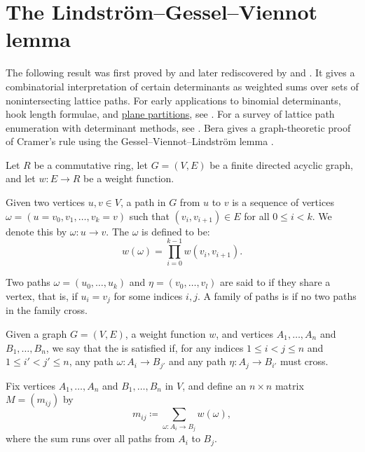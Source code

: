 


\section[lgvLemma]{The Lindström--Gessel--Viennot lemma}

The following result was first proved by  \cite{Lindstrom1973}
and later rediscovered by  and  \cite{GesselViennot1989}.
It gives a combinatorial interpretation of certain determinants as weighted sums over
sets of nonintersecting lattice paths.
For early applications to binomial determinants, hook length formulae, and
\hyperref[planePartitions]{plane partitions}, see
\cite{GesselViennot1985,GesselViennot1989}.  For a
survey of lattice path enumeration with determinant methods, see
\cite{Krattenthaler2015}.
Bera gives a graph-theoretic proof of Cramer's rule using the
Gessel--Viennot--Lindström lemma \cite{Bera2025x}.

Let $R$ be a commutative ring, let $G=(V,E)$ be a finite directed acyclic graph,
and let $w : E \to R$ be a weight function.

Given two vertices $u, v \in V$, a path in $G$ from $u$ to $v$ is a
sequence of vertices $\omega = (u = v_0, v_1, \dotsc, v_k = v)$ such
that $(v_i, v_{i+1}) \in E$ for all $0 \le i < k$.  We denote this by
$\omega : u \to v$.
The  $\omega$ is defined to be:
\[
w(\omega) = \prod_{i=0}^{k-1} w(v_i, v_{i+1}).
\]

\begin{definition}
Two paths $\omega = (u_0, \dotsc, u_k)$ and
$\eta = (v_0, \dotsc, v_l)$ are said to  if they share a
vertex, that is, if $u_i = v_j$ for some indices $i, j$.
A family of paths is \label{nonintersectingPaths}
if no two paths in the family cross.

Given a graph $G=(V,E)$, a weight function $w$,
and vertices $A_1, \dotsc, A_n$ and $B_1, \dotsc, B_n$, we say that the
\label{crossingCondition} is satisfied if, for
any indices $1 \le i \lt j \le n$ and $1 \le i' \lt j' \le n$,
any path $\omega : A_i \to B_{j'}$ and any path $\eta : A_j \to B_{i'}$ must cross.
\end{definition}

Fix vertices $A_1, \dotsc, A_n$ and $B_1, \dotsc, B_n$ in $V$, and define
an $n \times n$ matrix $M = (m_{ij})$ by
\[
m_{ij} \coloneqq \sum_{\omega : A_i \to B_j} w(\omega),
\]
where the sum runs over all paths from $A_i$ to $B_j$.

